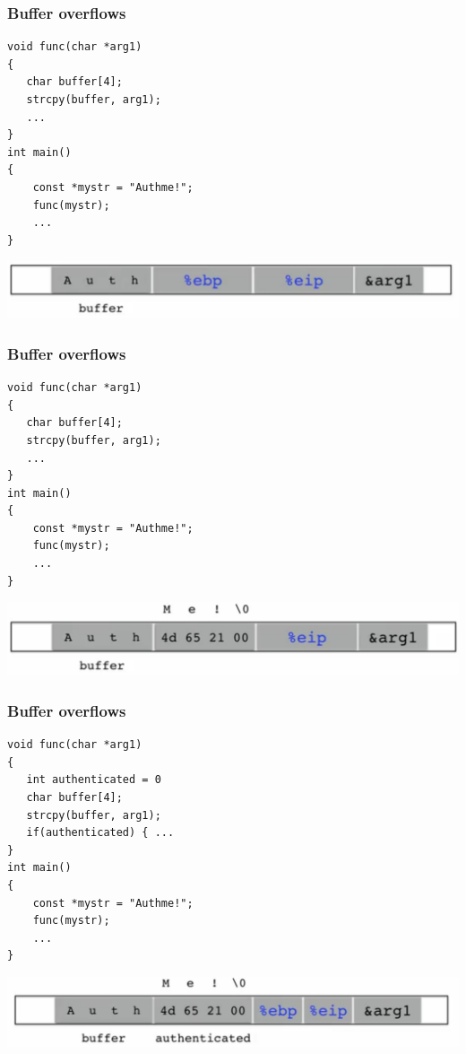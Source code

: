 \documentclass[serif,mathserif]{beamer}
\begin{document}
\begin{frame}[fragile]
  \frametitle{Buffer overflows}
\begin{lstlisting}
void func(char *arg1)
{
   char buffer[4];
   strcpy(buffer, arg1);
   ...
}
int main()
{
    const *mystr = "Authme!";
    func(mystr);
    ...
}
\end{lstlisting}
\begin{center}
\includegraphics[scale=0.20]{stackff6.png}
\end{center}

\end{frame}


\begin{frame}[fragile]
  \frametitle{Buffer overflows}
\begin{lstlisting}
void func(char *arg1)
{
   char buffer[4];
   strcpy(buffer, arg1);
   ...
}
int main()
{
    const *mystr = "Authme!";
    func(mystr);
    ...
}
\end{lstlisting}
\begin{center}
\includegraphics[scale=0.20]{stackff7.png}
\end{center}

\end{frame}



\begin{frame}[fragile]
  \frametitle{Buffer overflows}
\begin{lstlisting}
void func(char *arg1)
{
   int authenticated = 0
   char buffer[4];
   strcpy(buffer, arg1);
   if(authenticated) { ...
}
int main()
{
    const *mystr = "Authme!";
    func(mystr);
    ...
}
\end{lstlisting}
\begin{center}
\includegraphics[scale=0.20]{stackff8.png}
\end{center}

\end{frame}
\end{document}
